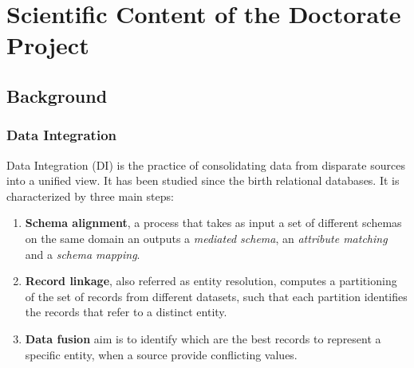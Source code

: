 \documentclass[12pt]{article}
\begin{document}


\section{Scientific Content of the Doctorate Project}
\subsection{Background}
\subsubsection{Data Integration}
Data Integration (DI) is the practice of consolidating data from disparate sources into a unified view. It has been studied since the birth relational databases. 
It is characterized by three main steps: 
\begin{enumerate}
   \item \textbf{Schema alignment}, a process that takes as input a set of different schemas on the same domain an outputs a \textit{mediated schema}, an \textit{attribute matching} and a \textit{schema mapping}.
   \item \textbf{Record linkage}, also referred as entity resolution, computes a partitioning of the set of records from different datasets, such that each partition identifies the records that refer to a distinct entity.
   \item \textbf{Data fusion} aim is to identify which are the best records to represent a specific entity, when a source provide conflicting values.
\end{enumerate}

\end{document}
